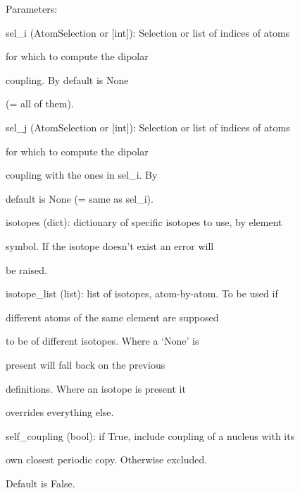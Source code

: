 \documentclass[letterpaper,10pt,english]{sphinxmanual}
\begin{document}
\begin{fulllineitems}
\begin{DUlineblock}{0em}
\item[] Parameters:
\item[]
\begin{DUlineblock}{\DUlineblockindent}
\item[] sel\_i (AtomSelection or {[}int{]}): Selection or list of indices of atoms
\item[]
\begin{DUlineblock}{\DUlineblockindent}
\item[] for which to compute the dipolar
\item[] coupling. By default is None
\item[] (= all of them).
\end{DUlineblock}
\item[] sel\_j (AtomSelection or {[}int{]}): Selection or list of indices of atoms
\item[]
\begin{DUlineblock}{\DUlineblockindent}
\item[] for which to compute the dipolar
\item[] coupling with the ones in sel\_i. By
\item[] default is None (= same as sel\_i).
\end{DUlineblock}
\item[] isotopes (dict): dictionary of specific isotopes to use, by element
\item[]
\begin{DUlineblock}{\DUlineblockindent}
\item[] symbol. If the isotope doesn't exist an error will
\item[] be raised.
\end{DUlineblock}
\item[] isotope\_list (list): list of isotopes, atom-by-atom. To be used if
\item[]
\begin{DUlineblock}{\DUlineblockindent}
\item[] different atoms of the same element are supposed
\item[] to be of different isotopes. Where a `None' is
\item[] present will fall back on the previous
\item[] definitions. Where an isotope is present it
\item[] overrides everything else.
\end{DUlineblock}
\item[] self\_coupling (bool): if True, include coupling of a nucleus with its
\item[]
\begin{DUlineblock}{\DUlineblockindent}
\item[] own closest periodic copy. Otherwise excluded.
\item[] Default is False.
\end{DUlineblock}
\end{DUlineblock}
\end{DUlineblock}


\end{fulllineitems}
\end{document}
